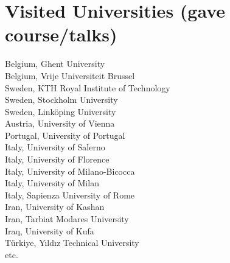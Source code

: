 \documentclass[a4paper,10pt]{article}
\begin{document}
\section{\textbf{Visited Universities (gave course/talks)}}
Belgium, Ghent University\\
Belgium, Vrije Universiteit Brussel\\
Sweden, KTH Royal Institute of Technology\\
Sweden, Stockholm University\\
Sweden, Linköping University\\
Austria, University of Vienna\\
Portugal, University of Portugal\\
Italy, University of Salerno\\
Italy, University of Florence\\
Italy, University of Milano-Bicocca\\
Italy, University of Milan\\
Italy, Sapienza University of Rome\\
Iran, University of Kashan\\
Iran, Tarbiat Modares University\\
Iraq, University of Kufa\\
Türkiye, Yıldız Technical University\\
etc.

\end{document}
